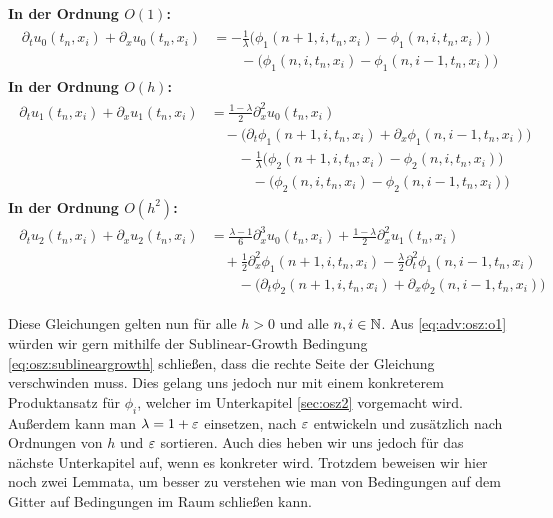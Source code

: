 \vspace{0.4cm}
\noindent \textbf{In der Ordnung $O(1)$:}
\begin{align}\label{eq:adv:osz:o1}
\begin{split}
\partial_t u_0(t_n, x_i) + \partial_x u_0(t_n, x_i) &= - \frac 1 \lambda \bigl( \phi_1(n+1, i, t_n, x_i) - \phi_1(n, i, t_n, x_i) \bigr)\\
&\qquad - \bigl(\phi_1(n, i, t_n, x_i) - \phi_1(n, i-1, t_n, x_i) \bigr)
\end{split}
\end{align}
\vspace{0.4cm}
\noindent \textbf{In der Ordnung $O(h)$:}
\begin{align}\label{eq:adv:osz:oh}
\begin{split}
\partial_t u_1(t_n, x_i) + \partial_x u_1(t_n, x_i) &= \frac {1-\lambda}{2} \partial^2_x u_0(t_n, x_i)\\
&\quad - \bigl( \partial_t \phi_1(n+1, i, t_n, x_i) + \partial_x \phi_1(n, i-1, t_n, x_i) \bigr)\\
&\qquad - \frac 1 \lambda \bigl( \phi_2(n+1, i, t_n, x_i) - \phi_2(n, i, t_n, x_i) \bigr)\\
&\qquad \quad - \bigl(\phi_2(n, i, t_n, x_i) - \phi_2(n, i-1, t_n, x_i) \bigr)
\end{split}
\end{align}
\vspace{0.4cm}
\noindent \textbf{In der Ordnung $O(h^2)$:}
\begin{align}\label{eq:adv:osz:oh2}
\begin{split}
\partial_t u_2(t_n, x_i) + \partial_x u_2(t_n, x_i) &= \frac{\lambda - 1}{6} \partial^3_x u_0(t_n, x_i) + \frac {1-\lambda}{2} \partial^2_x u_1(t_n, x_i)\\
&\quad + \frac 12 \partial^2_x \phi_1(n+1, i, t_n, x_i) - \frac{\lambda} 2 \partial^2_t \phi_1(n, i-1, t_n, x_i)\\
&\qquad - \bigl( \partial_t \phi_2(n+1, i, t_n, x_i) + \partial_x \phi_2(n, i-1, t_n, x_i) \bigr)
\end{split}
\end{align}

\vspace{0.4cm}
Diese Gleichungen gelten nun für alle $h > 0$ und alle $n, i \in \mathbb N$.
Aus \eqref{eq:adv:osz:o1} würden wir gern mithilfe der Sublinear-Growth Bedingung \eqref{eq:osz:sublineargrowth} schließen, dass die rechte Seite der Gleichung verschwinden muss.
Dies gelang uns jedoch nur mit einem konkreterem Produktansatz für $\phi_i$, welcher im Unterkapitel \ref{sec:osz2} vorgemacht wird.
Außerdem kann man $\lambda = 1 + \varepsilon$ einsetzen, nach $\varepsilon$ entwickeln und zusätzlich nach Ordnungen von $h$ und $\varepsilon$ sortieren.
Auch dies heben wir uns jedoch für das nächste Unterkapitel auf, wenn es konkreter wird.
Trotzdem beweisen wir hier noch zwei Lemmata, um besser zu verstehen wie man von Bedingungen auf dem Gitter auf Bedingungen im Raum schließen kann.

